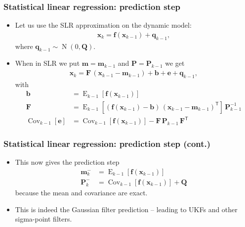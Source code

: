 \documentclass[first=dgreen,second=purple,presentation]{elecslides}
\newcommand{\mbf}[1]{\mathbf{#1}}
\newcommand{\T}[0]{\mathsf{T}}
\DeclareMathOperator{\Cov}{Cov}
\DeclareMathOperator{\E}{E}
\DeclareMathOperator{\N}{N}
\newcommand{\vb}{\mbf{b}}
\newcommand{\ve}{\mbf{e}}
\newcommand{\vf}{\mbf{f}}
\newcommand{\vm}{\mbf{m}}
\newcommand{\vq}{\mbf{q}}
\newcommand{\vx}{\mbf{x}}
\newcommand{\MF}{\mbf{F}}
\newcommand{\MP}{\mbf{P}}
\newcommand{\MQ}{\mbf{Q}}
\begin{document}
\begin{frame}
 \frametitle{Statistical linear regression: prediction step}

\begin{itemize}[<+->]
\item Let us use the SLR approximation on the \alert{dynamic model}:
%
\begin{equation}
\begin{split}
  \vx_{k} = \vf(\vx_{k-1}) + \vq_{k-1},
\end{split}
\nonumber
\end{equation}
%
where $\vq_{k-1} \sim \N(0,\MQ)$. 

\item When in SLR we put $\vm = \vm_{k-1}$ and $\MP = \MP_{k-1}$ we get
%
\begin{equation}
\begin{split}
  \vx_{k} = \MF \, (\vx_{k-1} - \vm_{k-1}) + \vb + \ve + \vq_{k-1},
\end{split}
\nonumber
\end{equation}
%
with
%
\begin{equation}
\begin{split}
  \vb &= \E_{k-1}\left[ \vf(\vx_{k-1}) \right] \\
  \MF &= \E_{k-1}\left[ (\vf(\vx_{k-1}) - \vb) \, (\vx_{k-1} - \vm_{k-1})^\T \right] \, \MP_{k-1}^{-1} \\
  \Cov_{k-1}[\ve] &= \Cov_{k-1}\left[ \vf(\vx_{k-1}) \right] - \MF \, \MP_{k-1} \, \MF^\T
\end{split}
\nonumber
\end{equation}
\end{itemize}
\end{frame}

\begin{frame}
 \frametitle{Statistical linear regression: prediction step (cont.)}

\begin{itemize}[<+->]
\item This now gives the \alert{prediction step}
%
\begin{equation}
\begin{split}
  \vm_k^- &= \E_{k-1}[ \vf(\vx_{k-1}) ] \\
  \MP_k^- &= \Cov_{k-1}[ \vf(\vx_{k-1}) ] + \MQ
\end{split}
\nonumber
\end{equation}
%
because the \alert{mean and covariance are exact}.

\item This is indeed the \alert{Gaussian filter prediction} -- leading to UKFs and other sigma-point filters.
\end{itemize}
\end{frame}
\end{document}
